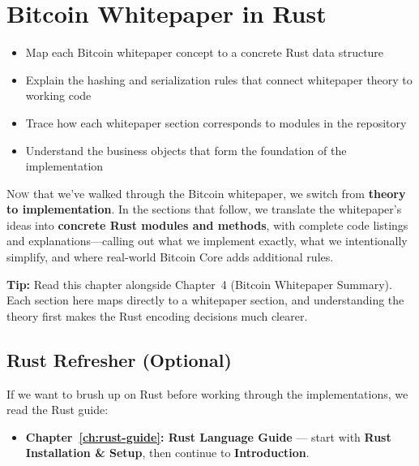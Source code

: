 \chapter{Bitcoin Whitepaper in Rust}
\label{ch:whitepaper-rust}

\begin{learnbox}
\begin{itemize}
  \item Map each Bitcoin whitepaper concept to a concrete Rust data structure
  \item Explain the hashing and serialization rules that connect whitepaper theory to working code
  \item Trace how each whitepaper section corresponds to modules in the repository
  \item Understand the business objects that form the foundation of the implementation
\end{itemize}
\end{learnbox}

\lettrine{N}{ow} that we've walked through the Bitcoin whitepaper, we switch from \textbf{theory to implementation}. In the sections that follow, we translate the whitepaper's ideas into \textbf{concrete Rust modules and methods}, with complete code listings and explanations---calling out what we implement exactly, what we intentionally simplify, and where real-world Bitcoin Core adds additional rules.

\begin{notebox}
\textbf{Tip:} Read this chapter alongside Chapter~4 (Bitcoin Whitepaper Summary). Each section here maps directly to a whitepaper section, and understanding the theory first makes the Rust encoding decisions much clearer.
\end{notebox}

\section{Rust Refresher (Optional)}
\label{sec:rust-refresher}

If we want to brush up on Rust before working through the implementations, we read the Rust guide:

\begin{itemize}
  \item \textbf{Chapter~\ref{ch:rust-guide}: Rust Language Guide} --- start with \textbf{Rust Installation \& Setup}, then continue to \textbf{Introduction}.
\end{itemize}

